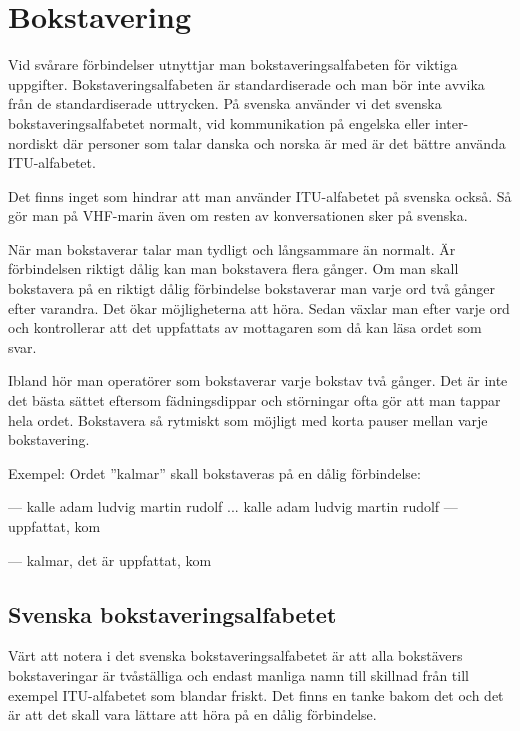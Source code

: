 \section{Bokstavering}

Vid svårare förbindelser utnyttjar man bokstaveringsalfabeten för viktiga uppgifter. Bokstaveringsalfabeten är standardiserade och man bör inte avvika från de standardiserade uttrycken. På svenska använder vi det svenska bokstaveringsalfabetet normalt, vid kommunikation på engelska eller inter-nordiskt där personer som talar danska och norska är med är det bättre använda ITU-alfabetet.

Det finns inget som hindrar att man använder ITU-alfabetet på svenska också. Så gör man på VHF-marin även om resten av konversationen sker på svenska.

När man bokstaverar talar man tydligt och långsammare än normalt. Är förbindelsen riktigt dålig kan man bokstavera flera gånger. Om man skall bokstavera på en riktigt dålig förbindelse bokstaverar man varje ord två gånger efter varandra. Det ökar möjligheterna att höra. Sedan växlar man efter varje ord och kontrollerar att det uppfattats av mottagaren som då kan läsa ordet som svar.

Ibland hör man operatörer som bokstaverar varje bokstav två gånger. Det är inte det bästa sättet eftersom fädningsdippar och störningar ofta gör att man tappar hela ordet. Bokstavera så rytmiskt som möjligt med korta pauser mellan varje bokstavering.

Exempel: Ordet ''kalmar'' skall bokstaveras på en dålig förbindelse:

--- kalle adam ludvig martin rudolf ... kalle adam ludvig martin rudolf --- uppfattat, kom

--- kalmar, det är uppfattat, kom

\subsection{Svenska bokstaveringsalfabetet}

Värt att notera i det svenska bokstaveringsalfabetet är att alla bokstävers bokstaveringar är tvåställiga och endast manliga namn till skillnad från till exempel ITU-alfabetet som blandar friskt. Det finns en tanke bakom det och det är att det skall vara lättare att höra på en dålig förbindelse.

